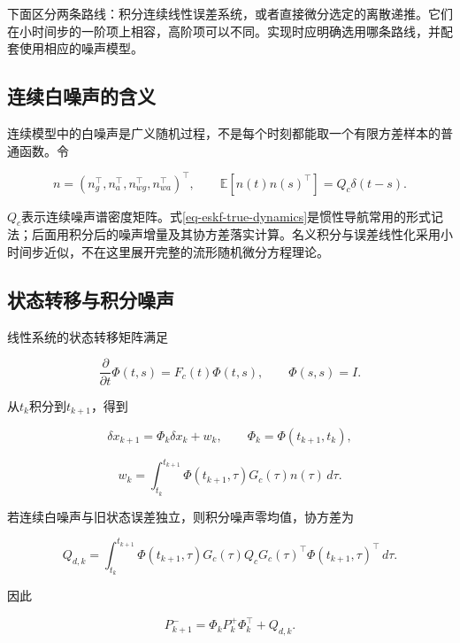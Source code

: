 下面区分两条路线：积分连续线性误差系统，或者直接微分选定的离散递推。它们在小时间步的一阶项上相容，高阶项可以不同。实现时应明确选用哪条路线，并配套使用相应的噪声模型。

\subsection{连续白噪声的含义}

连续模型中的白噪声是广义随机过程，不是每个时刻都能取一个有限方差样本的普通函数。令

\begin{equation*}
n=(n_g^\top,n_a^\top,n_{wg}^\top,n_{wa}^\top)^\top,
 \qquad \mathbb E[n(t)n(s)^\top]=Q_c\delta(t-s).
\end{equation*}

$Q_c$表示连续噪声谱密度矩阵。式\eqref{eq-eskf-true-dynamics}是惯性导航常用的形式记法；后面用积分后的噪声增量及其协方差落实计算。名义积分与误差线性化采用小时间步近似，不在这里展开完整的流形随机微分方程理论。

\subsection{状态转移与积分噪声}

线性系统的状态转移矩阵满足

\begin{equation*}
\frac{\partial}{\partial t}\Phi(t,s)=F_c(t)\Phi(t,s),
 \qquad\Phi(s,s)=I.
\end{equation*}

从$t_k$积分到$t_{k+1}$，得到

\begin{equation*}
\delta x_{k+1}=\Phi_k\delta x_k+w_k,
 \qquad\Phi_k=\Phi(t_{k+1},t_k),
\end{equation*}

\begin{equation*}
w_k=\int_{t_k}^{t_{k+1}}\Phi(t_{k+1},\tau)G_c(\tau)n(\tau)\,d\tau.
\end{equation*}

若连续白噪声与旧状态误差独立，则积分噪声零均值，协方差为

\begin{equation}\label{eq-eskf-qd}
Q_{d,k}=\int_{t_k}^{t_{k+1}}
 \Phi(t_{k+1},\tau)G_c(\tau)Q_cG_c(\tau)^\top
 \Phi(t_{k+1},\tau)^\top\,d\tau.
\end{equation}

因此

\begin{equation*}
\boxed{P_{k+1}^-=\Phi_kP_k^+\Phi_k^\top+Q_{d,k}.}
\end{equation*}

